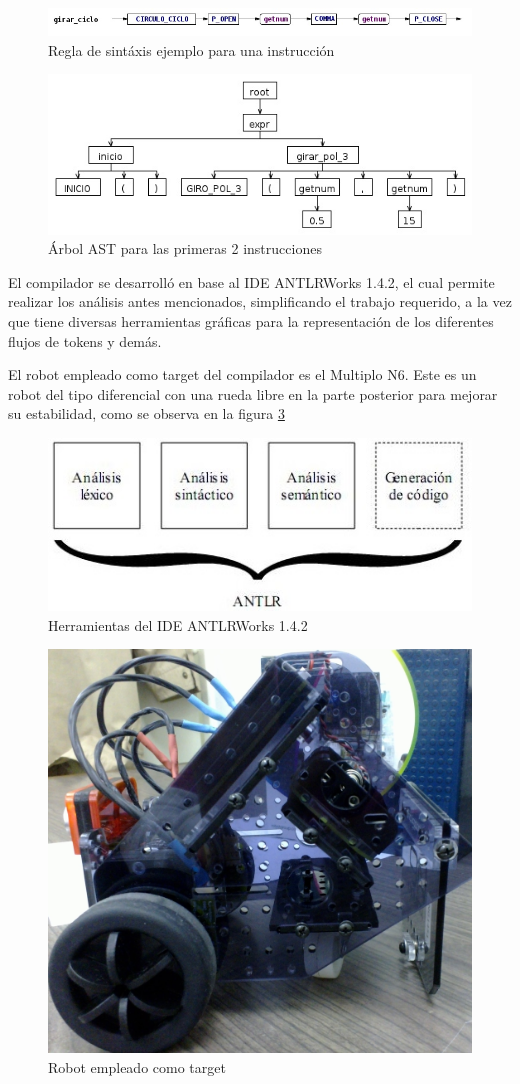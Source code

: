 \documentclass[12pt,a4paper]{article}
\begin{document}
    \begin{figure}[!h]
    \centering
        \includegraphics[width=0.7\linewidth]{./Rule_Ciclo.jpg}
    	\caption{Regla de sintáxis ejemplo para una instrucción}
    	\label{Sintaxis}
    \end{figure}
    
    \begin{figure}[!h]
    \centering
        \includegraphics[width=0.7\linewidth]{./AST_ejemplo.jpg}
    	\caption{Árbol AST para las primeras 2 instrucciones}
    	\label{AST}
    \end{figure}
    
    El compilador se desarrolló en base al IDE ANTLRWorks 1.4.2, el cual permite realizar los análisis antes mencionados, simplificando el trabajo requerido, a la vez que tiene diversas herramientas gráficas para la representación de los diferentes flujos de tokens y demás.
    
    El robot empleado como target del compilador es el Multiplo N6.
    Este es un robot del tipo diferencial con una rueda libre en la parte posterior para mejorar su estabilidad, como se observa en la figura \ref{N6}
    
	\begin{figure}[h]
	\centering
	\includegraphics[width=0.7\linewidth]{./antlr.jpg}
    \caption{Herramientas del IDE ANTLRWorks 1.4.2}
	\end{figure}
    
	\begin{figure}
	\centering
	\includegraphics[width=0.4\linewidth]{./N6}
    \caption{Robot empleado como target}
    \label{N6}
	\end{figure}
    
\end{document}
